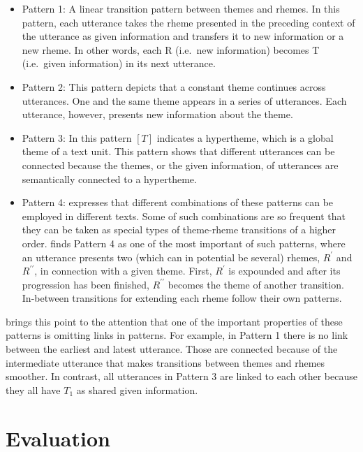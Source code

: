 \begin{itemize}
\item Pattern 1: A linear transition pattern between themes and rhemes. 
In this pattern, each utterance takes the rheme presented in the preceding context of the utterance as given information and transfers it to new information or a new rheme. 
In other words, each R (i.e.\ new information) becomes T (i.e.\ given information) in its next utterance. 


\item Pattern 2: This pattern depicts that a constant theme continues across utterances. 
One and the same theme appears in a series of utterances. 
Each utterance, however, presents new information about the theme. 


\item Pattern 3: In this pattern $[T]$ indicates a hypertheme, which is a global theme of a text unit.  
 This pattern shows that different utterances can be connected because the themes, or the given information,  of utterances are semantically connected to a hypertheme. 

 \item Pattern 4: 
  expresses that different combinations of these patterns can be employed in different texts. 
 Some of such combinations are so frequent that they can be taken as special types of theme-rheme transitions of a higher order. 
   finds Pattern 4 as one of the most important of such patterns, where an utterance presents two (which can in potential be several) rhemes, $R^\prime$ and $R^{\prime\prime}$, in connection with a given theme. 
  First, $R^{\prime}$ is expounded and after its progression has been finished, $R^{\prime\prime}$ becomes the theme of another transition. 
  In-between transitions for extending each rheme follow their own patterns. 
\end{itemize}

 brings this point to the attention that one of the important properties of these patterns is omitting links in patterns.  
For example, in Pattern 1 there is no link between the earliest and latest utterance. 
Those are connected because of the intermediate utterance that makes transitions between themes and rhemes smoother. 
In contrast, all utterances in Pattern 3  are linked to each other because they all have $T_1$ as shared given information. 

\section{Evaluation}
\label{sec:coh-eval}


